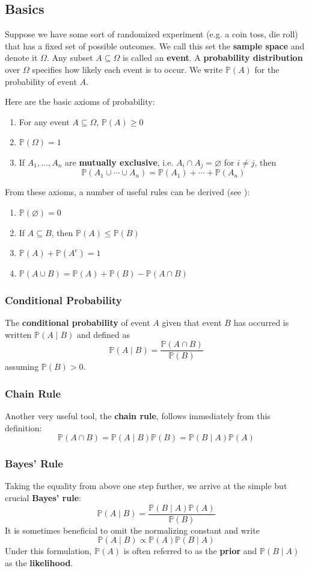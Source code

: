\documentclass{article}
\newcommand{\pr}[1]{\mathbb{P}(#1)}
\newcommand{\term}[1]{\textbf{#1}}
\begin{document}
\subsection{Basics}
Suppose we have some sort of randomized experiment (e.g. a coin toss, die roll) that has a fixed set of possible outcomes.  We call this set the \term{sample space} and denote it $\Omega$. Any subset $A \subseteq \Omega$ is called an \term{event}.
A \term{probability distribution} over $\Omega$ specifies how likely each event is to occur. We write $\pr{A}$ for the probability of event $A$.

Here are the basic axioms of probability:
\begin{enumerate}
\item For any event $A \subseteq \Omega$, $\pr{A} \geq 0$
\item $\pr{\Omega} = 1$
\item If $A_1, \dots, A_n$ are \term{mutually exclusive}, i.e. $A_i \cap A_j = \varnothing$ for $i \neq j$, then
\[\pr{A_1 \cup \cdots \cup A_n} = \pr{A_1} + \cdots + \pr{A_n}\]
\end{enumerate}
From these axioms, a number of useful rules can be derived (see \cite{pitman}):
\begin{enumerate}
\item $\pr{\varnothing} = 0$
\item If $A \subseteq B$, then $\pr{A} \leq \pr{B}$
\item $\pr{A} + \pr{A^c} = 1$
\item $\pr{A \cup B} = \pr{A} + \pr{B} - \pr{A \cap B}$
\end{enumerate}

\subsubsection{Conditional Probability}
The \term{conditional probability} of event $A$ given that event $B$ has occurred is written $\pr{A \mid B}$ and defined as
\[\pr{A \mid B} = \frac{\pr{A \cap B}}{\pr{B}}\]
assuming $\pr{B} > 0$.

\subsubsection{Chain Rule}
Another very useful tool, the \term{chain rule}, follows immediately from this definition:
\[\pr{A \cap B} = \pr{A \mid B}\pr{B} = \pr{B \mid A}\pr{A}\]

\subsubsection{Bayes' Rule}
Taking the equality from above one step further, we arrive at the simple but crucial \term{Bayes' rule}:
\[\pr{A \mid B} = \frac{\pr{B \mid A}\pr{A}}{\pr{B}}\]
It is sometimes beneficial to omit the normalizing constant and write
\[\pr{A \mid B} \propto \pr{A}\pr{B \mid A}\]
Under this formulation, $\pr{A}$ is often referred to as the \term{prior} and $\pr{B \mid A}$ as the \term{likelihood}.
\end{document}
